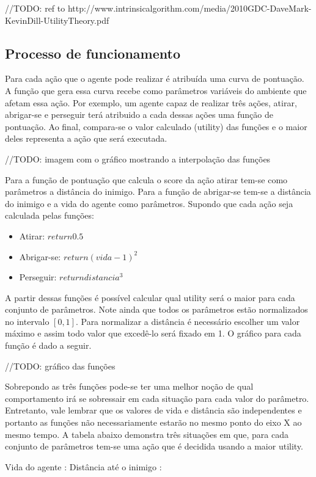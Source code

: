 \documentclass[12pt, 
openright, 
oneside, 
a4paper,    
brazil]{facom-ufu-abntex2}
\begin{document}
//TODO: ref to http://www.intrinsicalgorithm.com/media/2010GDC-DaveMark-KevinDill-UtilityTheory.pdf

\subsection{Processo de funcionamento}
Para cada ação que o agente pode realizar é atribuída uma curva de pontuação. A função que gera essa curva recebe como parâmetros variáveis do ambiente que afetam essa ação. Por exemplo, um agente capaz de realizar três ações, atirar, abrigar-se e perseguir terá atribuido a cada dessas ações uma função de pontuação. Ao final, compara-se o valor calculado (utility) das funções e o maior deles representa a ação que será executada.

//TODO: imagem com o gráfico mostrando a interpolação das funções

Para a função de pontuação que calcula o score da ação atirar tem-se como parâmetros a distância do inimigo. Para a função de abrigar-se tem-se a distância do inimigo e a vida do agente como parâmetros. Supondo que cada ação seja calculada pelas funções:

\begin{itemize}
    \item Atirar: $return 0.5$
    \item Abrigar-se: $return (vida - 1)^2$
    \item Perseguir: $return distancia^3$
\end{itemize}

 A partir dessas funções é possível calcular qual utility será o maior para cada conjunto de parâmetros. Note ainda que todos os parâmetros estão normalizados no intervalo $[0,1]$. Para normalizar a distância é necessário escolher um valor máximo e assim todo valor que excedê-lo será fixado em 1. O gráfico para cada função é dado a seguir.
 
 //TODO: gráfico das funções
 
 Sobrepondo as três funções pode-se ter uma melhor noção de qual comportamento irá se sobressair em cada situação para cada valor do parâmetro. Entretanto, vale lembrar que os valores de vida e distância são independentes e portanto as funções não necessariamente estarão no mesmo ponto do eixo X ao mesmo tempo.
 A tabela abaixo demonstra três situações em que, para cada conjunto de parâmetros tem-se uma ação que é decidida usando a maior utility.
 
 Vida do agente				:
 Distância até o inimigo	:
 
\end{document}
